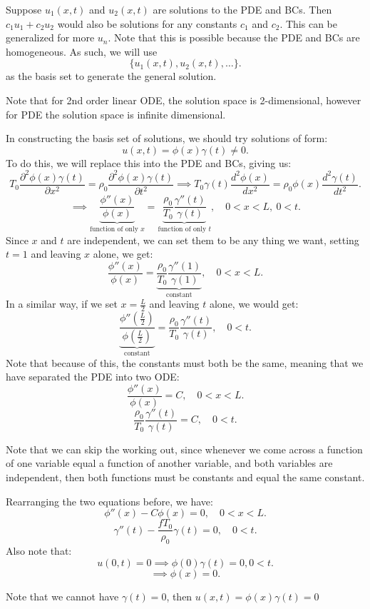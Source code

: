 \documentclass[../main/main.tex]{subfiles}
\begin{document}
Suppose $u_1(x,t)$ and $u_2(x,t)$ are solutions to the PDE and BCs. Then $c_1 u_1 + c_2 u_2$ would also be solutions for any constants $c_1$ and $c_2$. This can be generalized for more  $u_n$. Note that this is possible because the PDE and BCs are homogeneous. As such, we will use  \[
	\{u_1(x,t), u_2(x,t),\ldots\} 
.\] as the basis set to generate the general solution. 
\begin{remark}
	Note that for 2nd order linear ODE, the solution space is 2-dimensional, however for PDE the solution space is infinite dimensional.
\end{remark}
In constructing the basis set of solutions, we should try solutions of form: \[
	u(x,t) = \phi(x) \gamma(t)\neq 0
.\] 
To do this, we will replace this into the PDE and BCs, giving us: 
\[
	T_0 \frac{\partial ^2 \phi(x)\gamma(t)}{\partial x^2} = \rho_0 \frac{\partial ^2 \phi(x)\gamma(t)}{\partial t^2} \implies T_0 \gamma(t) \frac{d^2\phi(x)}{dx^2} = \rho_0 \phi(x) \frac{d^2\gamma(t)}{dt^2}
.\] \[
\implies \underbrace{\frac{\phi''(x)}{\phi(x)}}_{\text{function of only }x} = \underbrace{\frac{\rho_0}{T_0} \frac{\gamma''(t)}{\gamma(t)}}_{\text{function of only }t}, \quad 0 < x < L ,~ 0 < t
.\] Since $x$ and $t$ are independent, we can set them to be any thing we want, setting $t=1$ and leaving $x$ alone, we get: \[
\frac{\phi''(x)}{\phi(x)} = \underbrace{\frac{\rho_0}{T_0} \frac{\gamma''(1)}{\gamma(1)} }_{\text{constant}}, \quad 0 < x < L
.\] In a similar way, if we set $x = \frac{L}{2}$ and leaving $t$ alone, we would get: \[
\underbrace{\frac{\phi''(\frac{L}{2})}{\phi(\frac{L}{2})}}_{\text{constant}} = \frac{\rho_0}{T_0} \frac{\gamma''(t)}{\gamma(t)}, \quad 0 < t
.\] Note that because of this, the constants must both be the same, meaning that we have separated the PDE into two ODE: \[
\frac{\phi''(x)}{\phi(x)} = C, \quad 0 < x < L
.\] \[
\frac{\rho_0}{T_0} \frac{\gamma''(t) }{\gamma(t)} = C, \quad 0 < t
.\] 
\begin{remark}
	Note that we can skip the working out, since whenever we come across a function of one variable equal a function of another variable, and both variables are independent, then both functions must be constants and equal the same constant.
\end{remark}
Rearranging the two equations before, we have: \[
	\phi''(x) - C\phi(x) = 0 , \quad 0 < x < L
.\] \[
\gamma''(t) - \frac{fT_0}{\rho_0}\gamma(t) = 0, \quad 0 < t
.\] Also note that: \[
u(0,t) = 0 \implies \phi(0) \gamma(t) = 0, 0 < t 
.\] \[
\implies \phi(x) = 0
.\] 
\begin{remark}
	Note that we cannot have $\gamma(t) = 0$, then $u(x,t) = \phi(x)\gamma(t) = 0$
\end{remark}
\end{document}
